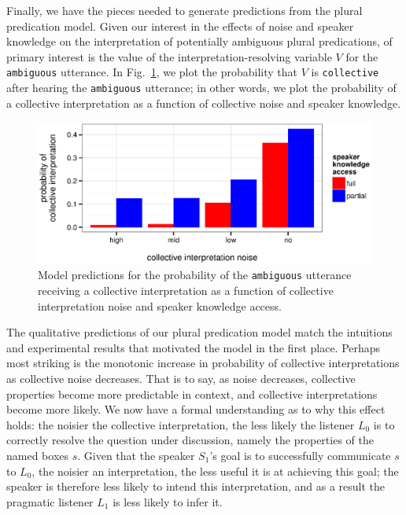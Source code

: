 \documentclass[linguex]{sp}
\begin{document}
Finally, we have the pieces needed to generate predictions from the plural predication model. Given our interest in the effects of noise and speaker knowledge on the interpretation of potentially ambiguous plural predications, of primary interest is the value of the interpretation-resolving variable $V$ for the \texttt{ambiguous} utterance. In Fig.~\ref{modelresults}, we plot the probability that $V$ is \texttt{collective} after hearing the \texttt{ambiguous} utterance; in other words, we plot the probability of a collective interpretation as a function of collective noise and speaker knowledge.

\begin{figure}[h]
	\centering
	\includegraphics[width=\linewidth]{plots/model-results2.eps}
	\vspace{-20pt}
	\caption{Model predictions for the probability of the \texttt{ambiguous} utterance receiving a collective interpretation as a function of collective interpretation noise and speaker knowledge access.} \label{modelresults}
\end{figure}

The qualitative predictions of our plural predication model match the intuitions and experimental results that motivated the model in the first place. Perhaps most striking is the monotonic increase in probability of collective interpretations as collective noise decreases. That is to say, as noise decreases, collective properties become more predictable in context, and collective interpretations become more likely. We now have a formal understanding as to why this effect holds: the noisier the collective interpretation, the less likely the listener $L_{0}$ is to correctly resolve the question under discussion, namely the properties of the named boxes $s$. Given that the speaker $S_{1}$'s goal is to successfully communicate $s$ to $L_{0}$, the noisier an interpretation, the less useful it is at achieving this goal; the speaker is therefore less likely to intend this interpretation, and as a result the pragmatic listener $L_{1}$ is less likely to infer it.
\end{document}
